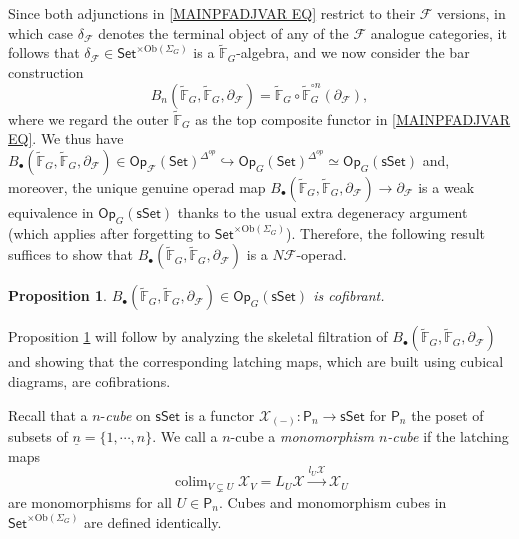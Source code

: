 \documentclass[a4paper,10pt
,draft
]{article}%
\numberwithin{equation}{section}
\numberwithin{figure}{section}
\newtheorem{proposition}[equation]{Proposition}%
\theoremstyle{definition} %
\DeclareMathOperator{\colim}{colim}%
\newcommand{\1}{\ensuremath{\mathbbm 1}}%
\begin{document}
Since both adjunctions in 
\eqref{MAINPFADJVAR EQ}
restrict to their $\mathcal{F}$ versions,
in which case $\delta_{\mathcal{F}}$ denotes the terminal object of any of the $\mathcal{F}$ analogue categories,
it follows that 
$\delta_{\mathcal{F}} \in \mathsf{Set}^{\times \text{Ob}(\Sigma_G)}$
is a 
$\widetilde{\mathbb{F}}_G$-algebra, 
and we now consider the bar construction
\[B_n(\widetilde{\mathbb{F}}_G,
\widetilde{\mathbb{F}}_G,
\partial_{\mathcal{F}})
= \widetilde{\mathbb{F}}_G \circ
\widetilde{\mathbb{F}}_G ^{\circ n} 
(\partial_{\mathcal{F}}),
\]
where we regard the outer $\widetilde{\mathbb{F}}_G$ as the top composite functor in \eqref{MAINPFADJVAR EQ}.
We thus have
$B_{\bullet}(\widetilde{\mathbb{F}}_G,
\widetilde{\mathbb{F}}_G,
\partial_{\mathcal{F}})
\in
\mathsf{Op}_{\mathcal{F}}(\mathsf{Set})^{\Delta^{op}}
	\hookrightarrow
\mathsf{Op}_G(\mathsf{Set})^{\Delta^{op}}
\simeq \mathsf{Op}_G(\mathsf{sSet})$
and, moreover, the unique genuine operad map
$B_{\bullet}(\widetilde{\mathbb{F}}_G,
\widetilde{\mathbb{F}}_G,
\partial_{\mathcal{F}})
\to 
\partial_{\mathcal{F}}$
is a weak equivalence in 
$\mathsf{Op}_G(\mathsf{sSet})$
thanks to the usual extra degeneracy argument
\cite[\S 4.5]{Ri14}
(which applies after forgetting to 
$\mathsf{Set}^{\times \text{Ob}(\Sigma_G)}$).
Therefore, 
the following result suffices to show that
$B_{\bullet}(\widetilde{\mathbb{F}}_G,
\widetilde{\mathbb{F}}_G,
\partial_{\mathcal{F}})
$
is a $N \mathcal{F}$-operad.

\begin{proposition}\label{BARCOF PROP}
$B_{\bullet}(\widetilde{\mathbb{F}}_G,
\widetilde{\mathbb{F}}_G,
\partial_{\mathcal{F}})
\in \mathsf{Op}_G(\mathsf{sSet})
$
is cofibrant.
\end{proposition}

Proposition \ref{BARCOF PROP}
will follow by analyzing the skeletal filtration of
$B_{\bullet}(\widetilde{\mathbb{F}}_G,
\widetilde{\mathbb{F}}_G,
\partial_{\mathcal{F}})
$ and showing that the corresponding latching maps,
which are built using cubical diagrams, are cofibrations.

Recall that a $n$-\textit{cube} on $\mathsf{sSet}$
is a functor
$\mathcal{X}_{(\minus)} \colon \mathsf{P}_n \to 
\mathsf{sSet}$
for $\mathsf{P}_n$ the poset of subsets of 
$\underline{n} = \{1,\cdots,n\}$.
We call a $n$-cube a \textit{monomorphism $n$-cube}
if the latching maps
\[
\colim_{V \subsetneq U} \mathcal{X}_V = L_U \mathcal{X}
\xrightarrow{l_U \mathcal{X}} 
\mathcal{X}_U
\]
are monomorphisms for all $U \in \mathsf{P}_n$.
Cubes and monomorphism cubes in
$\mathsf{Set}^{\times \text{Ob}(\Sigma_G)}$
are defined identically.
\end{document}

